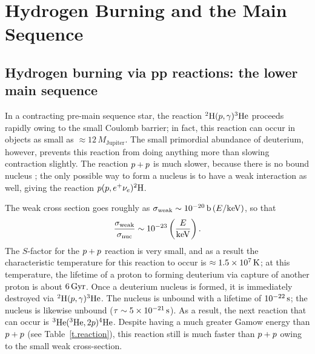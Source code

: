 \chapter{Hydrogen Burning and the Main Sequence}

\section[The pp chain]{Hydrogen burning via pp reactions: the lower main sequence}
\label{s.lower-ms}

In a contracting pre-main sequence star, the reaction $\hydrogen[2](p,\gamma)\helium[3]$ proceeds rapidly owing to the small Coulomb barrier; in fact, this reaction can occur in objects as small as $\approx 12\,M_{\mathrm{Jupiter}}$.  The small primordial abundance of deuterium, however, prevents this reaction from doing anything more than slowing contraction slightly.  The reaction $\pt +\pt$ is much slower, because there is no bound nucleus \helium[2]; the only possible way to form a nucleus is to have a weak interaction as well, giving the reaction $\pt(\pt,e^{+}\nu_{e})\hydrogen[2]$.

The weak cross section goes roughly as $\sigma_{\mathrm{weak}} \sim 10^{-20}\nsp\barn\left(E/\keV\right)$, so that
\[ \frac{\sigma_{\mathrm{weak}}}{\sigma_{\mathrm{nuc}}} \sim 10^{-23}\left(\frac{E}{\keV}\right). \]
The $S$-factor for the $\pt+\pt$ reaction is very small, and as a result the characteristic temperature for this reaction to occur is $\approx 1.5\ee{7}\nsp\K$; at this temperature, the lifetime of a proton to forming deuterium via capture of another proton is about $6\nsp\Giga\yr$.  Once a deuterium nucleus is formed, it is immediately destroyed via $\hydrogen[2](p,\gamma)\helium[3]$. The nucleus \lithium[4] is unbound with a lifetime of $10^{-22}\nsp\second$; the nucleus \beryllium[6] is likewise unbound ($\tau \sim 5\ee{-21}\nsp\second$). As a result, the next reaction that can occur is $\helium[3](\helium[3],2\pt)\helium$.  Despite having a much greater Gamow energy than $\pt + \pt$ (see Table~\ref{t.reaction}), this reaction still is much faster than $\pt+\pt$ owing to the small weak cross-section.

